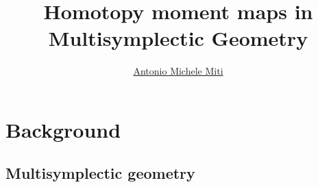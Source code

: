 \documentclass[handout,10pt]{beamer}
\title{Homotopy moment maps in Multisymplectic Geometry}
\subtitle{}
\author[AMM]{\href{https://dmf.unicatt.it/miti/}{Antonio Michele Miti}}
\institute[UCSC and KU Leuven]{
  \begin{tabular}[h]{ccc}
      Università Cattolica del Sacro Cuore & $\qquad$ & KU Leuven \\
      Brescia, Italy & & Leuven, Belgium \\
  \end{tabular}      
}
\date[KULeuven_20] %
{	
	{\vskip 1ex}
	Euler Institute Interview, January 12, 2021
}
\newcommand{\checkpoint}[0]{
	\ifHandout

	\else
	\addtocounter{framenumber}{-1}
 	\begin{frame}{Outline}
  		\tableofcontents[currentsection]
	\end{frame}
	\fi
}
\begin{document}
\section{Background}
\subsection{Multisymplectic geometry}
\end{document}
